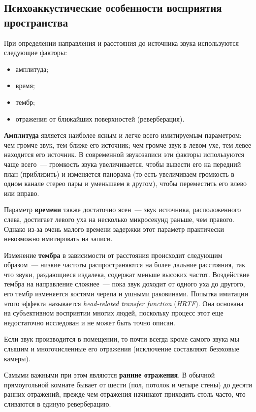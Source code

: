 \documentclass[oneside, final, 14pt]{extreport}
\begin{document}
\subsection{Психоаккустические особенности восприятия пространства}
При определении направления и расстояния до источника звука используются следующие факторы:
\begin{itemize}
  \item амплитуда;
  \item время;
  \item тембр;
  \item отражения от ближайших поверхностей (реверберация).
\end{itemize}

\textbf{Амплитуда} является наиболее ясным и легче всего имитируемым параметром: чем громче звук, тем ближе его источник; чем громче звук в левом ухе, тем левее находится его источник. В современной звукозаписи эти факторы используются чаще всего~--- громкость звука увеличивается, чтобы вывести его на передний план (приблизить) и изменяется панорама (то есть увеличиваем громкость в одном канале стерео пары и уменьшаем в другом), чтобы переместить его влево или вправо.

Параметр \textbf{времени} также достаточно ясен~--- звук источника, расположенного слева, достигает левого уха на несколько микросекунд раньше, чем правого. Однако из-за очень малого времени задержки этот параметр практически невозможно имитировать на записи.

Изменение \textbf{тембра} в зависимости от расстояния происходит следующим образом~--- низкие частоты распространяются на более дальние расстояния, так что звуки, раздающиеся издалека, содержат меньше высоких частот. Воздействие тембра на направление сложнее~--- пока звук доходит от одного уха до другого, его тембр изменяется костями черепа и ушными раковинами. Попытка имитации этого эффекта называется \emph{head-related transfer function} (\emph{HRTF}). Она основана на субъективном восприятии многих людей, поскольку процесс этот еще недостаточно исследован и не может быть точно описан.

Если звук производится в помещении, то почти всегда кроме самого звука мы слышим и многочисленные его отражения (исключение составляют безэховые камеры).

Самыми важными при этом являются \textbf{ранние отражения}. В обычной прямоугольной комнате бывает от шести (пол, потолок и четыре стены) до десяти ранних отражений, прежде чем отражения начинают приходить столь часто, что сливаются в единую реверберацию.
\end{document}
